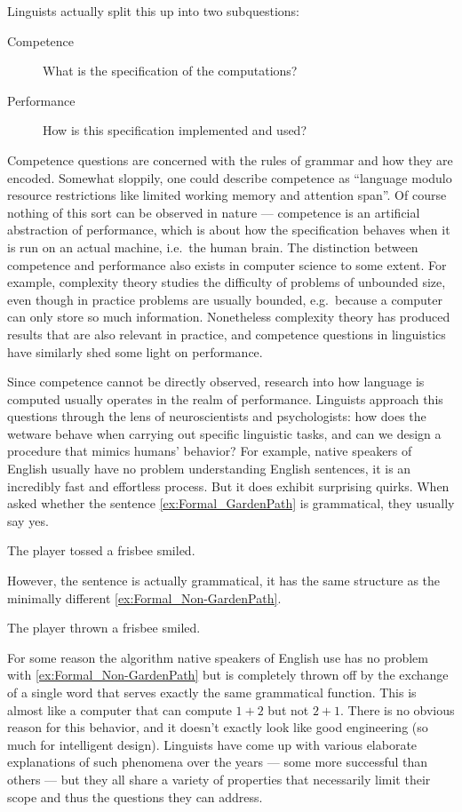Linguists actually split this up into two subquestions:
%
\begin{description}
    \item[Competence] What is the specification of the computations?
    \item[Performance] How is this specification implemented and used?
\end{description}
%
Competence questions are concerned with the rules of grammar and how they are encoded.
Somewhat sloppily, one could describe competence as ``language modulo resource restrictions like limited working memory and attention span''.
Of course nothing of this sort can be observed in nature --- competence is an artificial abstraction of performance, which is about how the specification behaves when it is run on an actual machine, i.e.\ the human brain.
The distinction between competence and performance also exists in computer science to some extent.
For example, complexity theory studies the difficulty of problems of unbounded size, even though in practice problems are usually bounded, e.g.\ because a computer can only store so much information.
Nonetheless complexity theory has produced results that are also relevant in practice, and competence questions in linguistics have similarly shed some light on performance.

Since competence cannot be directly observed, research into how language is computed usually operates in the realm of performance.
Linguists approach this questions through the lens of neuroscientists and psychologists: how does the wetware behave when carrying out specific linguistic tasks, and can we design a procedure that mimics humans' behavior?
For example, native speakers of English usually have no problem understanding English sentences, it is an incredibly fast and effortless process.
But it does exhibit surprising quirks.
When asked whether the sentence \eqref{ex:Formal_GardenPath} is grammatical, they usually say yes.
%
\begin{exe}
        \ex The player tossed a frisbee smiled.\label{ex:Formal_GardenPath}
\end{exe}
%
However, the sentence is actually grammatical, it has the same structure as the minimally different \eqref{ex:Formal_Non-GardenPath}. 
%
\begin{exe}
    \ex The player thrown a frisbee smiled.\label{ex:Formal_Non-GardenPath}
\end{exe}
%
For some reason the algorithm native speakers of English use has no problem with \eqref{ex:Formal_Non-GardenPath} but is completely thrown off by the exchange of a single word that serves exactly the same grammatical function.
This is almost like a computer that can compute $1 + 2$ but not $2 + 1$.
There is no obvious reason for this behavior, and it doesn't exactly look like good engineering (so much for intelligent design).
Linguists have come up with various elaborate explanations of such phenomena over the years --- some more successful than others ---
but they all share a variety of properties that necessarily limit their scope and thus the questions they can address.

